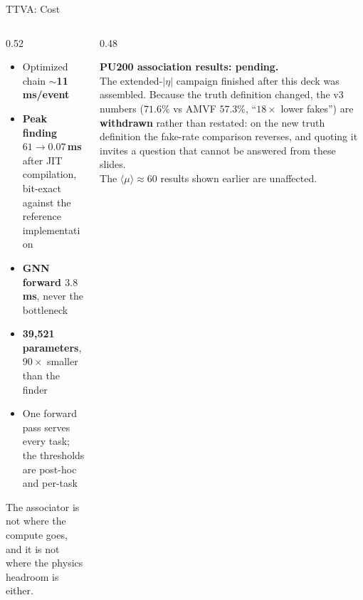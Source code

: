 \documentclass[xcolor=table,aspectratio=169]{beamer}
\begin{document}
\begin{frame}{TTVA: Cost}
    \begin{columns}[c]
        \begin{column}{0.52\linewidth}
            \small
            \begin{itemize}
                \setlength\itemsep{0.45em}
                \item Optimized chain \(\sim\)\textbf{11\,ms/event}
                \item \textbf{Peak finding $61 \to 0.07$\,ms} after JIT compilation,
                    bit-exact against the reference implementation
                \item \textbf{GNN forward $3.8$\,ms}, never the bottleneck
                \item \textbf{39{,}521 parameters}, $90\times$ smaller than the finder
                \item One forward pass serves every task; the thresholds are post-hoc
                    and per-task
            \end{itemize}
            \vspace{0.4em}
            {\footnotesize\textcolor{black!55}{The associator is not where the compute
            goes, and it is not where the physics headroom is either.}}
        \end{column}
        \begin{column}{0.48\linewidth}
            \centering
            \setlength{\fboxsep}{7pt}
            \colorbox{pennred!8}{\parbox{0.93\linewidth}{\small
            \textcolor{pennred}{\textbf{PU200 association results: pending.}}\\[0.4em]
            The extended-$|\eta|$ campaign finished after this deck was assembled.
            Because the truth definition changed, the v3 numbers
            ($71.6\%$ vs AMVF $57.3\%$, ``$18\times$ lower fakes'') are
            \textbf{withdrawn} rather than restated: on the new truth definition the
            fake-rate comparison reverses, and quoting it invites a question that
            cannot be answered from these slides.\\[0.4em]
            The $\langle\mu\rangle\!\approx\!60$ results shown earlier are unaffected.}}
        \end{column}
    \end{columns}
\end{frame}

\end{document}
